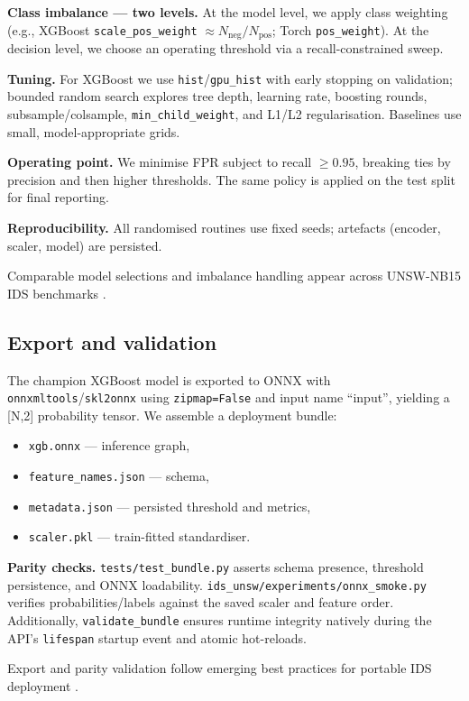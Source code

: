 \documentclass{article}
\begin{document}
\textbf{Class imbalance — two levels.} At the model level, we apply class weighting (e.g., XGBoost \texttt{scale\_pos\_weight} $\approx N_{\text{neg}}/N_{\text{pos}}$; Torch \texttt{pos\_weight}). At the decision level, we choose an operating threshold via a recall-constrained sweep.

\textbf{Tuning.} For XGBoost we use \texttt{hist}/\texttt{gpu\_hist} with early stopping on validation; bounded random search explores tree depth, learning rate, boosting rounds, subsample/colsample, \texttt{min\_child\_weight}, and L1/L2 regularisation. Baselines use small, model-appropriate grids.

\textbf{Operating point.} We minimise FPR subject to recall $\ge 0.95$, breaking ties by precision and then higher thresholds. The same policy is applied on the test split for final reporting.

\textbf{Reproducibility.} All randomised routines use fixed seeds; artefacts (encoder, scaler, model) are persisted.

Comparable model selections and imbalance handling appear across UNSW-NB15 IDS benchmarks \cite{kocher2020, mohamed2023}.

\subsection{Export and validation}
The champion XGBoost model is exported to ONNX with \texttt{onnxmltools}/\texttt{skl2onnx} using \texttt{zipmap=False} and input name ``input'', yielding a [N,2] probability tensor. We assemble a deployment bundle:
\begin{itemize}
    \item \texttt{xgb.onnx} — inference graph,
    \item \texttt{feature\_names.json} — schema,
    \item \texttt{metadata.json} — persisted threshold and metrics,
    \item \texttt{scaler.pkl} — train-fitted standardiser.
\end{itemize}
\textbf{Parity checks.} \texttt{tests/test\_bundle.py} asserts schema presence, threshold persistence, and ONNX loadability. \texttt{ids\_unsw/experiments/onnx\_smoke.py} verifies probabilities/labels against the saved scaler and feature order. Additionally, \texttt{validate\_bundle} ensures runtime integrity natively during the API's \texttt{lifespan} startup event and atomic hot-reloads.

Export and parity validation follow emerging best practices for portable IDS deployment \cite{pinto2024}.
\end{document}
